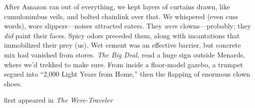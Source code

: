 After Amazon ran out of everything, we kept layers of curtains drawn,
like cumulonimbus veils, and bolted chainlink over that. We whispered
(even cuss words), wore slippers---noises attracted eaters. They
\emph{were} clowns---probably; they \emph{did} paint their faces. Spicy
odors preceded them, along with incantations that immobilized their prey
(us). Wet cement was an effective barrier, but concrete mix had vanished
from stores. \emph{The Big Deal,} read a huge sign outside Menards,
where we'd trekked to make sure. From inside a floor-model gazebo, a
trumpet segued into ``2,000 Light Years from Home,'' then the flapping
of enormous clown shoes.

first appeared in \emph{The Were-Traveler}
